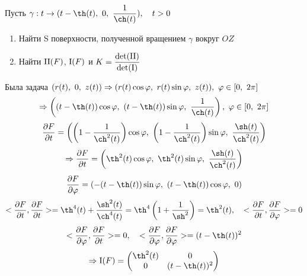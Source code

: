 \documentclass[12pt, fleqn]{article}
\begin{document}
\begin{example}
  Пусть $\gamma: t \ra (t - \th(t),\ 0,\ \dfrac{1}{\ch(t)}),\q t>0$
  \begin{enumerate}
    \item Найти S поверхности, полученной вращением $\gamma$ вокруг $OZ$
    \item Найти $\RNumb{2}(F)$, $\RNumb{1}(F)$ и $K=\dfrac{\det(\RNumb{2})}{\det(\RNumb{1})}$
  \end{enumerate}
\end{example}

\begin{sol}
  Была задача $ (r(t),\ 0,\ z(t)) \Ra (r(t) \cos \varphi,\ r(t)\sin \varphi,\ z(t)),\ \varphi \in [0,\ 2\pi]$\\
  \[\Ra \Br{
    \Br{t - \th(t)}\cos \varphi,\
    \Br{t - \th(t)}\sin \varphi,\
    \dfrac{1}{\ch(t)}},\
  \varphi \in [0,\ 2\pi]\]
  \[\frac{\d F}{\d t} = \Br{
    \Br{1 - \frac{1}{\ch^2(t)}}\cos \varphi,\
    \Br{1 - \frac{1}{\ch^2(t)}}\sin \varphi,\
    \frac{\sh(t)}{\ch^2(t)}
  }\]
  \[\Ra \frac{\d F}{\d t} = \Br{
    \th^2 (t)\cos \varphi,\
    \th^2 (t)\sin \varphi,\
    \frac{\sh(t)}{\ch^2(t)}
  }\]
  \[\frac{\d F}{\d \varphi} = \Br{
    -(t-\th(t))\sin \varphi,\
    (t-\th(t))\cos \varphi,\
    0
  }\]
  \[<\frac{\d F}{\d t}, \frac{\d F}{\d t}> = \th^4 (t)+\frac{\sh^2 (t)}{\ch^4 (t)} = \th^4 \Br{1+\dfrac{1}{\sh^2}} =\th^2 (t),\q
  <\frac{\d F}{\d t}, \frac{\d F}{\d \varphi}> = 0\]
  \[<\frac{\d F}{\d \varphi}, \frac{\d F}{\d t}> = 0,\q
  <\frac{\d F}{\d \varphi}, \frac{\d F}{\d \varphi}> = (t-\th(t))^2 \]
  \[\Ra \RNumb{1}(F) =
  \begin{pmatrix}
    {}\th^2 (t) & 0\\
    0 & (t-\th(t))^2
  \end{pmatrix}\]


\end{sol}
\end{document}
